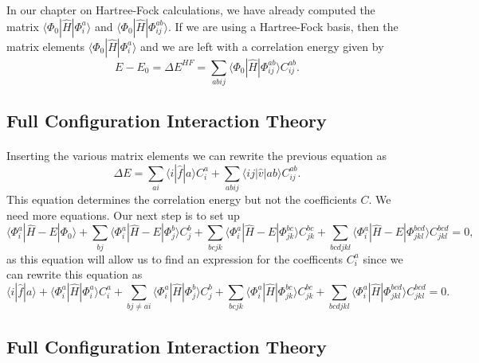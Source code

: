 \documentclass[%
twoside,                 %
final,                   %
10pt]{article}
\begin{document}
In our chapter on Hartree-Fock calculations, 
we have already computed the matrix $\langle \Phi_0 | \hat{H}|\Phi_{i}^{a}\rangle $ and $\langle \Phi_0 | \hat{H}|\Phi_{ij}^{ab}\rangle$.  If we are using a Hartree-Fock basis, then the matrix elements
$\langle \Phi_0 | \hat{H}|\Phi_{i}^{a}\rangle $ and we are left with a correlation energy given by
\[
E-E_0 =\Delta E^{HF}=\sum_{abij}\langle \Phi_0 | \hat{H}|\Phi_{ij}^{ab} \rangle C_{ij}^{ab}. 
\]



\subsection*{Full Configuration Interaction Theory}

\paragraph{}
Inserting the various matrix elements we can rewrite the previous equation as
\[
\Delta E=\sum_{ai}\langle i| \hat{f}|a \rangle C_{i}^{a}+
\sum_{abij}\langle ij | \hat{v}| ab \rangle C_{ij}^{ab}.
\]
This equation determines the correlation energy but not the coefficients $C$. 
We need more equations. Our next step is to set up
\[
\langle \Phi_i^a | \hat{H} -E| \Phi_0\rangle + \sum_{bj}\langle \Phi_i^a | \hat{H} -E|\Phi_{j}^{b} \rangle C_{j}^{b}+
\sum_{bcjk}\langle \Phi_i^a | \hat{H} -E|\Phi_{jk}^{bc} \rangle C_{jk}^{bc}+
\sum_{bcdjkl}\langle \Phi_i^a | \hat{H} -E|\Phi_{jkl}^{bcd} \rangle C_{jkl}^{bcd}=0,
\]
as this equation will allow us to find an expression for the coefficents $C_i^a$ since we can rewrite this equation as 
\[
\langle i | \hat{f}| a\rangle +\langle \Phi_i^a | \hat{H}|\Phi_{i}^{a} \rangle C_{i}^{a}+ \sum_{bj\ne ai}\langle \Phi_i^a | \hat{H}|\Phi_{j}^{b} \rangle C_{j}^{b}+
\sum_{bcjk}\langle \Phi_i^a | \hat{H}|\Phi_{jk}^{bc} \rangle C_{jk}^{bc}+
\sum_{bcdjkl}\langle \Phi_i^a | \hat{H}|\Phi_{jkl}^{bcd} \rangle C_{jkl}^{bcd}=0.
\]



\subsection*{Full Configuration Interaction Theory}

\end{document}

